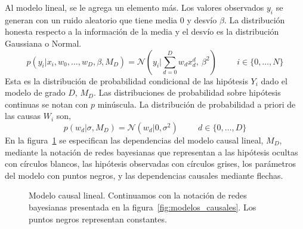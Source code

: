 \documentclass[a4paper,11pt]{book}
\newcommand{\N}{\mathcal{N}}
\theoremstyle{definition}
\begin{document}

Al modelo lineal, se le agrega un elemento más.
%
Los valores observados $y_i$ se generan con un ruido aleatorio que tiene media 0 y desv\'io $\beta$.
%
La distribución honesta respecto a la información de la media y el desv\'io es la distribución Gaussiana o Normal.
%
\begin{equation} \label{eq:likelihood_modelo_lineal}
p(y_i|x_i, w_0, \dots, w_D, \beta, M_D) = \N(y_i| \sum_{d = 0}^{D} w_d x_d^d,\ \beta^2) \hspace{1cm} \text{$i \in \{0,\dots, N\}$}
\end{equation}
%
Esta es la distribución de probabilidad condicional de las hipótesis $Y_i$ dado el modelo de grado $D$, $M_D$.
%
Las distribuciones de probabilidad sobre hipótesis continuas se notan con $p$ minúscula.
%
La distribución de probabilidad a priori de las causas $W_i$ son,
%
\begin{equation} \label{eq:prior_modelo_lineal}
p(w_d|\sigma,M_D) = \N(w_d|0, \sigma^2) \hspace{1cm} \text{$d \in \{0,\dots,D\}$}
\end{equation}
%
En la figura~\ref{fig:modelo_lineal} se especifican las dependencias del modelo causal lineal, $M_D$, mediante la notación de redes bayesianas que representan a las hipótesis ocultas con c\'irculos blancos, las hipótesis observadas con c\'irculos grises, los parámetros del modelo con puntos negros, y las dependencias causales mediante flechas.
%
\begin{figure}[ht!]
    \centering
    \begin{subfigure}[c]{0.45\textwidth}
    \centering
    \end{subfigure}
    \caption{Modelo causal lineal. Continuamos con la notación de redes bayesianas presentada en la figura~\ref{fig:modelos_causales}. Los puntos negros representan constantes.}
    \label{fig:modelo_lineal}
\end{figure}
\end{document}
